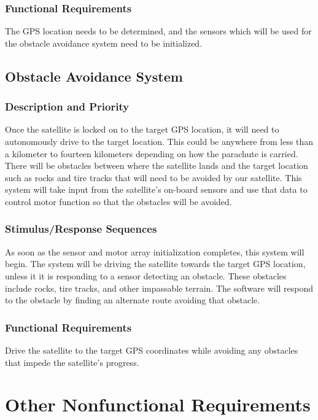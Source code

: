 \documentclass{scrreprt}
\begin{document}
\subsection{Functional Requirements}
The GPS location needs to be determined, and the sensors which will be used for the obstacle avoidance system need to be initialized. 

\section{Obstacle Avoidance System}

\subsection{Description and Priority}
Once the satellite is locked on to the target GPS location, it will need to autonomously drive to the target location. This could be anywhere from less than a kilometer to fourteen kilometers depending on how the parachute is carried. There will be obstacles between where the satellite lands and the target location such as rocks and tire tracks that will need to be avoided by our satellite. This system will take input from the satellite's on-board sensors and use that data to control motor function so that the obstacles will be avoided.


\subsection{Stimulus/Response Sequences}
As soon as the sensor and motor array initialization completes, this system will begin. The system will be driving the satellite towards the target GPS location, unless it it is responding to a sensor detecting an obstacle. These obstacles include rocks, tire tracks, and other impassable terrain. The software will respond to the obstacle by finding an alternate route avoiding that obstacle. 

\subsection{Functional Requirements}
Drive the satellite to the target GPS coordinates while avoiding any obstacles that impede the satellite's progress.

\chapter{Other Nonfunctional Requirements}
\end{document}
